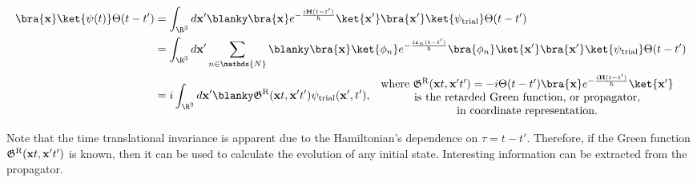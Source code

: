 \begin{equation}
    \begin{split}
        \bra{{\bf x}} \ket{\psi(t)} \Theta(t-t') &= \int_{\R^3} d{\bf x}' \blanky \bra{{\bf x}} e^{-\frac{i {\bf H} (t-t')}{\hbar}} \ket{{\bf x}'}\bra{{\bf x}'} \ket{\psi_{\textnormal{trial}}} \Theta(t-t') \\
        &=  \int_{\R^3} d{\bf x}' \sum_{n \in \mathds{N}} \blanky \bra{{\bf x}} \ket{\phi_n} e^{-\frac{i \varepsilon_n (t-t')}{\hbar}} \bra{\phi_n}\ket{{\bf x}'}\bra{{\bf x}'} \ket{\psi_{\textnormal{trial}}} \Theta(t-t') \\
        &= i \int_{\R^3} d{\bf x}' \blanky \mathfrak{G}^{\textnormal{R}}({\bf x}t, {\bf x}'t') \psi_{\textnormal{trial}}({\bf x}', t'), \begin{array}{c}
             \textnormal{ where } \mathfrak{G}^{\textnormal{R}}({\bf x}t, {\bf x}'t') = - i \Theta(t-t') \bra{{\bf x}} e^{-\frac{i {\bf H} (t-t')}{\hbar}} \ket{{\bf x}'} \\
             \textnormal{ is the retarded Green function, or propagator,} \\
             \textnormal{ in coordinate representation.}
        \end{array}
    \end{split} 
    \label{NR-1particle-GF}
\end{equation}

Note that the time translational invariance is apparent due to the Hamiltonian's dependence on $\tau = t-t'$. Therefore, if the Green function $\mathfrak{G}^{\textnormal{R}}({\bf x}t, {\bf x}'t')$ is known, then it can be used to calculate the evolution of any initial state. Interesting information can be extracted from the propagator. 

